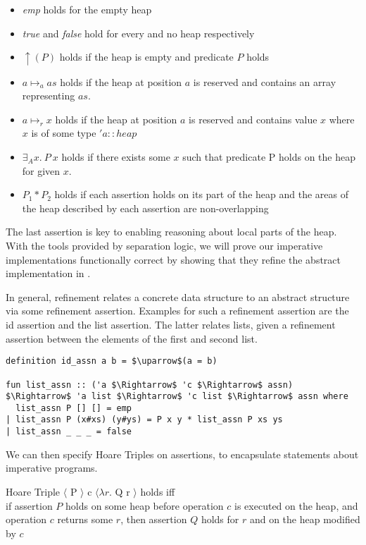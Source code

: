 \begin{itemize}
    \item \textit{emp} holds for the empty heap
    \item \textit{true} and \textit{false} hold for every and no heap respectively
    \item $\uparrow(P)$ holds if the heap is empty and predicate $P$ holds
    \item $a \mapsto_a as$ holds if the heap at position $a$ is reserved and contains
    an array representing $as$.
    \item $a \mapsto_r x$ holds if the heap at position $a$ is reserved and contains
    value $x$ where $x$ is of some type $'a::heap$
    \item $\exists_A x.\ P\ x$ holds if there exists some $x$ such that predicate P
    holds on the heap for given $x$.
    \item $P_1 * P_2$ holds if each assertion holds on its part of the heap
    and the areas of the heap described by each assertion are non-overlapping
\end{itemize}

The last assertion is key to enabling reasoning about local
parts of the heap.
With the tools provided by separation logic,
we will prove our imperative implementations functionally correct
by showing that they refine the abstract implementation in .

In general, refinement relates a concrete data structure
to an abstract structure via some refinement assertion.
Examples for such a refinement assertion are the id assertion and the
list assertion.
The latter relates lists, given a refinement
assertion between the elements of the first and second list.

\begin{lstlisting}[mathescape=true, language=Isabelle]
definition id_assn a b = $\uparrow$(a = b)

fun list_assn :: ('a $\Rightarrow$ 'c $\Rightarrow$ assn) $\Rightarrow$ 'a list $\Rightarrow$ 'c list $\Rightarrow$ assn where
  list_assn P [] [] = emp
| list_assn P (x#xs) (y#ys) = P x y * list_assn P xs ys
| list_assn _ _ _ = false
\end{lstlisting}

We can then specify Hoare Triples on assertions,
to encapsulate statements about imperative programs.

\begin{definition}{Hoare Triple}
    $\langle$ P $\rangle$ c $\langle \lambda r. $ Q r $\rangle$ holds iff \\
    if assertion $P$ holds on some heap before operation $c$
    is executed on the heap,
    and operation $c$ returns some $r$, then assertion $Q$ holds
    for $r$ and on the heap modified by $c$
\end{definition}

